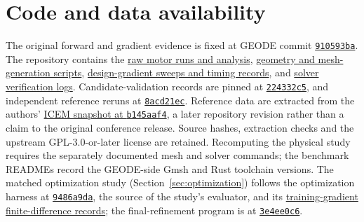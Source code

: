 \documentclass{anvil-paper}
\begin{document}
\section*{Code and data availability}
The original forward and gradient evidence is fixed at GEODE commit
\href{https://github.com/rjwalters/geode-fem/tree/910593bad6f64f9f01671c2632b57034e72b9c61}{\texttt{910593ba}}.
The repository contains the
\href{https://github.com/rjwalters/geode-fem/tree/910593bad6f64f9f01671c2632b57034e72b9c61/benchmarks/motor_reference/forward_harmonic}{raw motor runs and analysis},
\href{https://github.com/rjwalters/geode-fem/tree/910593bad6f64f9f01671c2632b57034e72b9c61/benchmarks/motor_reference/geometry}{geometry and mesh-generation scripts},
\href{https://github.com/rjwalters/geode-fem/tree/910593bad6f64f9f01671c2632b57034e72b9c61/benchmarks/motor_shape_gradient/design}{design-gradient sweeps and timing records},
and \href{https://github.com/rjwalters/geode-fem/tree/910593bad6f64f9f01671c2632b57034e72b9c61/benchmarks/motor_nonlinear_m1}{solver verification logs}.
Candidate-validation records are pinned at
\href{https://github.com/rjwalters/geode-fem/tree/224332c526be1191183af82b610973c7778de720/benchmarks/motor_validation}{\texttt{224332c5}},
and independent reference reruns at
\href{https://github.com/rjwalters/geode-fem/tree/8acd21ecf85d89fe077275a3c04ca70b53963d43/benchmarks/motor_reference/reference_refinement}{\texttt{8acd21ec}}.
Reference data are extracted from the authors'
\href{https://github.com/MichaelWiesheu/ICEMsnapshot/tree/b145aaf4ab1a6424828bc941eaf172f48fa0d458}{ICEM snapshot at \texttt{b145aaf4}},
a later repository revision rather than a claim to the original conference
release. Source hashes, extraction checks and the upstream GPL-3.0-or-later license
are retained. Recomputing the physical study requires the separately
documented mesh and solver commands; the benchmark READMEs record the
GEODE-side Gmsh and Rust toolchain versions.
The matched optimization study (Section~\ref{sec:optimization}) follows the
optimization harness at
\href{https://github.com/rjwalters/geode-fem/tree/9486a9da58beeca91968d4d3608f06b998abff45/benchmarks/motor_optimization}{\texttt{9486a9da}},
the source of the study's evaluator, and its
\href{https://github.com/rjwalters/geode-fem/tree/9486a9da58beeca91968d4d3608f06b998abff45/benchmarks/motor_optimization/runs}{training-gradient finite-difference records};
the final-refinement program is at
\href{https://github.com/rjwalters/geode-fem/tree/3e4ee0c63a86dbf014a76c9faf04dd962da16911/crates/geode-core/examples/icem_final_refinement.rs}{\texttt{3e4ee0c6}}.
\end{document}
